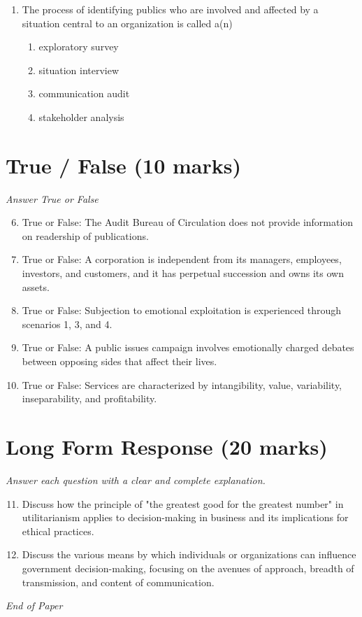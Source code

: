 \documentclass[12pt]{article}
\begin{document}
\begin{enumerate}[label=\arabic*.]
\begin{enumerate}[label=(\alph*)]
    \item Generally cheaper to gather than primary data and takes less time to find.
\end{enumerate}
\item The process of identifying publics who are involved and affected by a situation central to an organization is called a(n)
\begin{enumerate}[label=(\alph*)]
    \item exploratory survey
    \item situation interview
    \item communication audit
    \item stakeholder analysis
\end{enumerate}
\end{enumerate}

\section*{True / False (10 marks)}
\textit{Answer True or False}
\begin{enumerate}[label=\arabic*.]
\setcounter{enumi}{5}
\item True or False: The Audit Bureau of Circulation does not provide information on readership of publications.
\item True or False: A corporation is independent from its managers, employees, investors, and customers, and it has perpetual succession and owns its own assets.
\item True or False: Subjection to emotional exploitation is experienced through scenarios 1, 3, and 4.
\item True or False: A public issues campaign involves emotionally charged debates between opposing sides that affect their lives.
\item True or False: Services are characterized by intangibility, value, variability, inseparability, and profitability.
\end{enumerate}

\section*{Long Form Response (20 marks)}
\textit{Answer each question with a clear and complete explanation.}
\begin{enumerate}[label=\arabic*.]
\setcounter{enumi}{10}
\item Discuss how the principle of "the greatest good for the greatest number" in utilitarianism applies to decision-making in business and its implications for ethical practices.
\item Discuss the various means by which individuals or organizations can influence government decision-making, focusing on the avenues of approach, breadth of transmission, and content of communication.
\end{enumerate}

\vfill
\noindent\textit{End of Paper}
\end{document}
